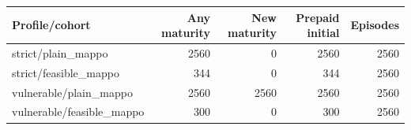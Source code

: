 \begin{tabular}{lrrrr}
\toprule
Profile/cohort & Any maturity & New maturity & Prepaid initial & Episodes \\
\midrule
strict/plain\_mappo & 2560 & 0 & 2560 & 2560 \\
strict/feasible\_mappo & 344 & 0 & 344 & 2560 \\
vulnerable/plain\_mappo & 2560 & 2560 & 2560 & 2560 \\
vulnerable/feasible\_mappo & 300 & 0 & 300 & 2560 \\
\bottomrule
\end{tabular}
